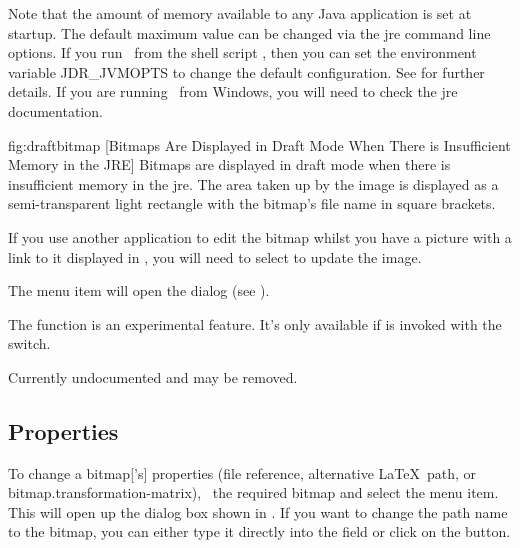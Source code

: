 Note that the amount of memory available to any Java application is
set at startup. The default maximum value can be changed via the
\gls{jre} command line options.  If you run \FlowframTk\ from the
shell script , then you can set the environment
variable \gls{JDR_JVMOPTS} to change the default configuration. See
 for further details. If you are running
\FlowframTk\ from Windows, you will need to check the \gls*{jre}
documentation.

\FloatFig
  {fig:draftbitmap}
  {}
  [Bitmaps Are Displayed in Draft Mode When There is Insufficient Memory in the JRE]
  {Bitmaps are displayed in draft mode
when there is insufficient memory in the \gls{jre}. The area taken up by
the image is displayed as a semi-transparent light  rectangle
with the bitmap's file name in square brackets.}


If you use another application to edit the bitmap whilst
you have a picture with a link to it displayed in \FlowframTk, you will
need to select  to update the image.


The  menu item will open the 
 dialog (see ).


The  function is an experimental
feature. It's only available if  is invoked with
the  switch.

Currently undocumented and may be removed.

\subsection{Properties}\label{sec:bitmapprops}


To change a \gls{bitmap}['s] properties (file reference, alternative
\LaTeX\ path, or \gls{bitmap.transformation-matrix}), \select\
the required \gls{bitmap} and select the 
menu item. This will open up the \dialog{bitmap_properties} dialog box shown in
\figureref{fig:bitmapprops}. If you want to change the path name to
the bitmap, you can either type it directly into the
 field or click on the
 button.

